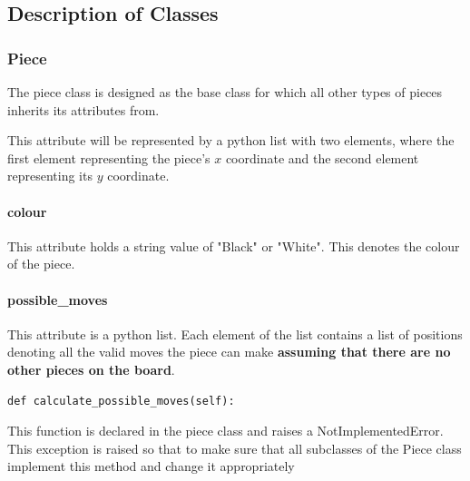 \documentclass[]{report}
\begin{document}
\subsection{Description of Classes}
\subsubsection{Piece}
The piece class is designed as the base class for which all other types of pieces inherits its attributes from. 

This attribute will be represented by a python list with two elements, where the first element representing the piece's $x$ coordinate and the second element representing its $y$ coordinate. 
\paragraph{colour} This attribute holds a string value of "Black" or "White". This denotes the colour of the piece.
\paragraph{possible{\_}moves} This attribute is a python list. Each element of the list contains a list of positions denoting all the valid moves the piece can make \textbf{assuming that there are no other pieces on the board}.
\begin{verbatim}
def calculate_possible_moves(self):
\end{verbatim}
This function is declared in the piece class and raises a NotImplementedError. This exception is raised so that to make sure that all subclasses of the Piece class implement this method and change it appropriately 
\end{document}
